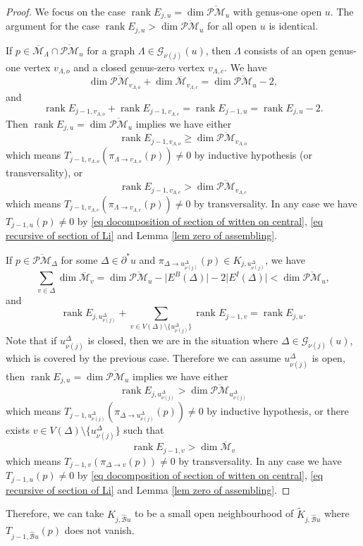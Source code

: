 \documentclass[11pt]{amsart}
\theoremstyle{definition}
\theoremstyle{remark}
\newcommand{\oPMb}{{\overline{\mathcal{PM}}}}
\newcommand{\<}{\left<}
\renewcommand{\>}{\right>}
\numberwithin{equation}{section}
\DeclareMathOperator{\rk}{rank}
\def\Mbar{{\overline{\mathcal M}}}
\begin{document}
    \begin{proof}
        We focus on the case $\rk E_{j,u}= \dim \oPMb_u$ with genus-one open $u$. The argument for the case $\rk E_{j,u}> \dim \oPMb_u$ for all open $u$ is identical.

        If $p\in \Mbar_\Lambda\cap \oPMb_u$ for a graph $\Lambda\in \mathcal G_{\nu(j)}(u)$, then $\Lambda$ consists of an open genus-one vertex $v_{\Lambda,o}$ and a closed genus-zero vertex $v_{\Lambda,c}$. We have $$\dim \oPMb_{v_{\Lambda,o}}+\dim \Mbar_{v_{\Lambda,c}}=\dim \oPMb_u -2,$$ and 
        $$
            \rk E_{j-1,v_{\Lambda,o}}+ \rk E_{j-1,v_{\Lambda,c}}= \rk E_{j-1,u}= \rk E_{j,u}-2.
        $$
        Then $\rk E_{j,u}= \dim \oPMb_u$ implies we have either $$\rk E_{j-1,v_{\Lambda,o}}\ge \dim \oPMb_{v_{\Lambda,o}}$$ which means $T_{j-1,v_{\Lambda,o}}\left(\pi_{\Lambda\to v_{\Lambda,o}}(p)\right)\ne 0$ by inductive hypothesis (or transversality), or $$\rk E_{j-1,v_{\Lambda,c}}> \dim \oPMb_{v_{\Lambda,c}}$$
        which means $T_{j-1,v_{\Lambda,c}}\left(\pi_{\Lambda\to v_{\Lambda,c}}(p)\right)\ne 0$ by transversality. In any case we have $T_{j-1,u}\left(p\right)\ne 0$ by \eqref{eq docomposition of section of witten on central}, \eqref{eq recursive of section of Li} and Lemma \ref{lem zero of assembling}.

        
        
        If $p\in \oPMb_\Delta$ for some $\Delta \in \partial^* u$ and $\pi_{\Delta \to u^{\Delta}_{\nu(j)}}(p)\in K_{j,u^{\Delta}_{\nu(j)}}$, we have 
        $$
        \sum_{v\in \Delta} \dim \Mbar_v=\dim \oPMb_{u}-\lvert E^B(\Delta)\rvert-2 \lvert E^I(\Delta)\rvert<\dim \oPMb_{u},
        $$
        and
        $$
        \rk E_{j,u^{\Delta}_{\nu(j)}}+\sum_{v\in V(\Delta)\setminus\{u^{\Delta}_{\nu(j)}\}}\rk E_{j-1,v}= \rk E_{j,u}.
        $$
        Note that if $u^{\Delta}_{\nu(j)}$ is closed, then we are in the situation where $\Delta\in \mathcal G_{\nu(j)}(u)$, which is covered by the previous case. Therefore we can assume $u^{\Delta}_{\nu(j)}$ is open,         then $\rk E_{j,u}= \dim \oPMb_u$ implies we have either $$\rk E_{j,u^{\Delta}_{\nu(j)}}> \dim \oPMb_{u^{\Delta}_{\nu(j)}}$$ which means $T_{j-1,u^{\Delta}_{\nu(j)}}\left(\pi_{\Delta\to u^{\Delta}_{\nu(j)}}(p)\right)\ne 0$ by inductive hypothesis, or there exists $v\in V(\Delta)\setminus\{u^{\Delta}_{\nu(j)}\}$ such that
         $$\rk E_{j-1,v}> \dim \Mbar_{v}$$
        which means $T_{j-1,v}\left(\pi_{\Delta\to v}(p)\right)\ne 0$ by transversality. In any case we have $T_{j-1,u}\left(p\right)\ne 0$ by \eqref{eq docomposition of section of witten on central}, \eqref{eq recursive of section of Li} and Lemma \ref{lem zero of assembling}.
        \end{proof}
    Therefore, we can take $K_{j,\hat{\mathcal B}u}$ to be a small open neighbourhood of $\tilde{K}_{j,\hat{\mathcal B}u}$ where $T_{j-1,{\hat{\mathcal B}u}}(p)$ does not vanish.
\end{document}
